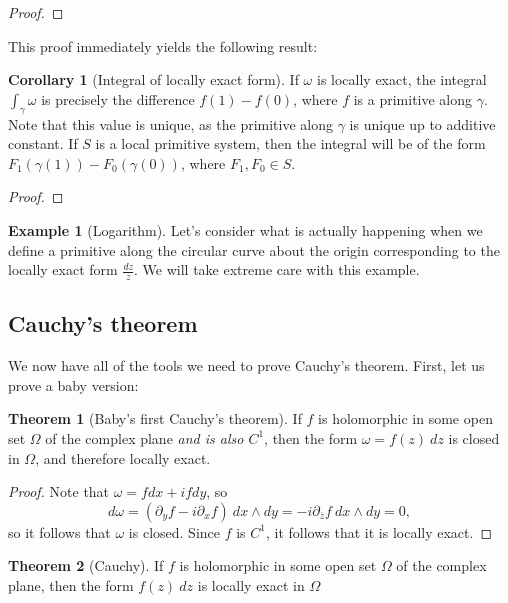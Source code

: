 \documentclass[aps,pra,showpacs,notitlepage,onecolumn,superscriptaddress,nofootinbib]{revtex4-1}
\theoremstyle{definition}
\newtheorem{theorem}{Theorem}[section]
\newtheorem{corollary}{Corollary}[theorem]
\newtheorem{example}{Example}[section]
\begin{document}
\begin{proof}
\end{proof}

\noindent This proof immediately yields the following result:

\begin{corollary}[Integral of locally exact form]
  If $\omega$ is locally exact, the integral $\int_{\gamma} \omega$ is precisely the difference $f(1) - f(0)$, where $f$ is a primitive along $\gamma$. Note that this
  value is unique, as the primitive along $\gamma$ is unique up to additive constant. If $S$ is a local primitive system, then the integral will
  be of the form $F_1(\gamma(1)) - F_0(\gamma(0))$, where $F_1, F_0 \in S$.
\end{corollary}
\begin{proof}
  \noindent 
  \end{proof}

\begin{example}[Logarithm]
  Let's consider what is actually happening when we define a primitive along the circular curve about the origin corresponding to the locally exact form $\frac{dz}{z}$.
  We will take extreme care with this example.
  \end{example}

\subsection{Cauchy's theorem}

\noindent We now have all of the tools we need to prove Cauchy's theorem. First, let us prove a baby version:

\begin{theorem}[Baby's first Cauchy's theorem]
  If $f$ is holomorphic in some open set $\Omega$ of the complex plane \emph{and is also $C^{1}$}, then the form $\omega = f(z) \ dz$ is closed in $\Omega$,
  and therefore locally exact.
\end{theorem}

\begin{proof}
  Note that $\omega = f dx + i f dy$, so
  $$d\omega = (\partial_y f - i  \partial_x f) \ dx \wedge dy = -i \partial_{\overline{z}} f \ dx \wedge dy = 0,$$
  so it follows that $\omega$ is closed. Since $f$ is $C^{1}$, it follows that it is locally exact.
\end{proof}

\begin{theorem}[Cauchy]
  If $f$ is holomorphic in some open set $\Omega$ of the complex plane, then the form $f(z) \ dz$ is locally exact in $\Omega$
\end{theorem}
\end{document}

